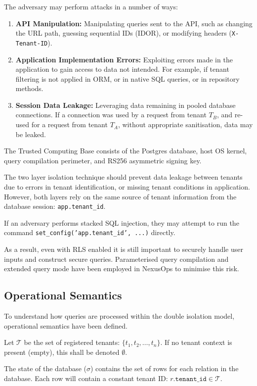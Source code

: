 \documentclass[conference]{IEEEtran}
\begin{document}
The adversary may perform attacks in a number of ways:
\begin{enumerate}
\item \textbf{API Manipulation:} Manipulating queries sent to the API, such as changing the URL path, guessing sequential IDs (IDOR), or modifying headers (\texttt{X-Tenant-ID}).
\item \textbf{Application Implementation Errors:} Exploiting errors made in the application to gain access to data not intended. For example, if tenant filtering is not applied in ORM, or in native SQL queries, or in repository methods.
\item \textbf{Session Data Leakage:} Leveraging data remaining in pooled database connections. If a connection was used by a request from tenant $T_B$, and re-used for a request from tenant $T_A$, without appropriate sanitisation, data may be leaked.
\end{enumerate}

The Trusted Computing Base consists of the Postgres database, host OS kernel, query compilation perimeter, and RS256 asymmetric signing key.

The two layer isolation technique should prevent data leakage between tenants due to errors in tenant identification, or missing tenant conditions in application. However, both layers rely on the same source of tenant information from the database session: \texttt{app.tenant\_id}.

If an adversary performs stacked SQL injection, they may attempt to run the command \texttt{set\_config('app.tenant\_id', ...)} directly.

As a result, even with RLS enabled it is still important to securely handle user inputs and construct secure queries. Parameterised query compilation and extended query mode have been employed in NexusOps to minimise this risk.

\subsection{Operational Semantics}
To understand how queries are processed within the double isolation model, operational semantics have been defined.

Let $\mathcal{T}$ be the set of registered tenants: $\{t_1, t_2, \dots, t_n\}$. If no tenant context is present (empty), this shall be denoted $\emptyset$.

The state of the database ($\sigma$) contains the set of rows for each relation in the database. Each row will contain a constant tenant ID: $r.\texttt{tenant\_id} \in \mathcal{T}$.
\end{document}
